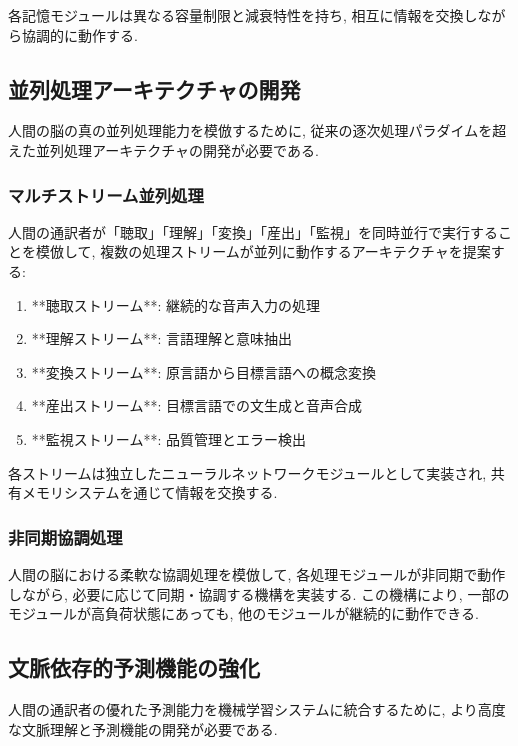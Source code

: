各記憶モジュールは異なる容量制限と減衰特性を持ち, 相互に情報を交換しながら協調的に動作する.

\subsection{並列処理アーキテクチャの開発}

人間の脳の真の並列処理能力を模倣するために, 従来の逐次処理パラダイムを超えた並列処理アーキテクチャの開発が必要である.

\subsubsection{マルチストリーム並列処理}

人間の通訳者が「聴取」「理解」「変換」「産出」「監視」を同時並行で実行することを模倣して, 複数の処理ストリームが並列に動作するアーキテクチャを提案する:

\begin{enumerate}
\item **聴取ストリーム**: 継続的な音声入力の処理
\item **理解ストリーム**: 言語理解と意味抽出
\item **変換ストリーム**: 原言語から目標言語への概念変換
\item **産出ストリーム**: 目標言語での文生成と音声合成
\item **監視ストリーム**: 品質管理とエラー検出
\end{enumerate}

各ストリームは独立したニューラルネットワークモジュールとして実装され, 共有メモリシステムを通じて情報を交換する.

\subsubsection{非同期協調処理}

人間の脳における柔軟な協調処理を模倣して, 各処理モジュールが非同期で動作しながら, 必要に応じて同期・協調する機構を実装する.
この機構により, 一部のモジュールが高負荷状態にあっても, 他のモジュールが継続的に動作できる.

\subsection{文脈依存的予測機能の強化}

人間の通訳者の優れた予測能力を機械学習システムに統合するために, より高度な文脈理解と予測機能の開発が必要である.


